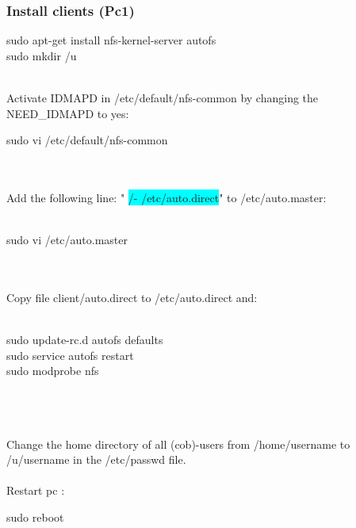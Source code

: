 \subsubsection{Install clients (Pc1)} 
   \colorbox{light-gray}{
         \begin{minipage}{1.0\textwidth} 
		sudo apt-get install nfs-kernel-server autofs \\
		sudo mkdir /u
        \end{minipage}  } \\
Activate IDMAPD in /etc/default/nfs-common by changing the NEED\_IDMAPD to yes: \\
   \colorbox{light-gray}{
         \begin{minipage}{1.0\textwidth} 
		sudo vi /etc/default/nfs-common
         \end{minipage}  } \\
\\Add the following  line: " \colorbox{cyan}{/-      /etc/auto.direct}" to  /etc/auto.master:\\
\\   \colorbox{light-gray}{
         \begin{minipage}{1.0\textwidth} 
		sudo vi /etc/auto.master
         \end{minipage}  } \\
	\\
Copy file client/auto.direct to /etc/auto.direct and: \\
\\
   \colorbox{light-gray}{
         \begin{minipage}{1.0\textwidth}
	sudo update-rc.d autofs defaults\\
	sudo service autofs restart	\\
	sudo modprobe nfs
         \end{minipage}  } \\
\\
\\Change the home directory of all (cob)-users from /home/username to /u/username in the /etc/passwd file.\\
\\Restart pc :
\\
   \colorbox{light-gray}{
         \begin{minipage}{1.0\textwidth} 
		sudo reboot
         \end{minipage}  } \\
         \\          
         
